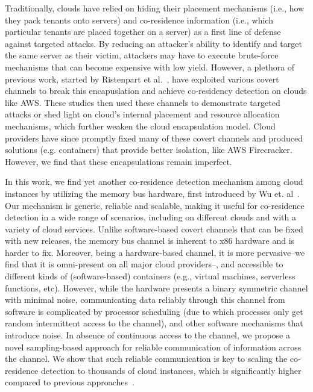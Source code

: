 Traditionally, clouds have relied on hiding their placement mechanisms (i.e.,
how they pack tenants onto servers) and co-residence information (i.e., which
particular tenants are placed together on a server) as a first line of defense
against targeted attacks. By reducing an attacker's ability to identify and
target the same server as their victim, attackers may have to execute
brute-force mechanisms that can become expensive with low yield. However, a plethora of
previous work, started by Ristenpart et al.~\cite{ristenpartccs2009}, have
exploited various covert channels to break this encapuslation and 
achieve co-residency detection on clouds
like AWS. These studies then used these channels to demonstrate targeted attacks
or shed light on cloud's internal placement and resource allocation
mechanisms, which further weaken the cloud encapsulation model. Cloud
providers have since promptly fixed many of these covert channels and produced
solutions (e.g. containers) that provide better isolation, like AWS
Firecracker\cite{firecracker}. However, we find that these encapsulations remain
imperfect.


In this work, we find yet another co-residence detection mechanism among cloud
instances by utilizing the memory bus hardware, first introduced by Wu et.
al~\cite{wuusenix2012}. Our mechanism is generic, reliable 
and scalable, making it useful for co-residence detection in a wide range of 
scenarios, including on different clouds and with a variety of cloud services.
Unlike software-based covert channels that can be fixed with new releases, 
the memory bus channel is inherent to x86 hardware and is harder to fix.  
Moreover, being a hardware-based channel, it is more pervasive--we find that it is
omni-present on all major cloud providers--, and accessible to different kinds of 
(software-based) containers (e.g., virtual machines, serverless functions, etc). 
However, while the hardware presents a binary symmetric channel with minimal 
noise, communicating data reliably through this channel from software is 
complicated by processor scheduling (due to which processes only get random 
intermittent access to the channel), and other software mechanisms that 
introduce noise. In absence of continuous access to the channel, we propose a 
novel sampling-based approach for reliable communication of information 
across the channel. We show that such reliable communication is key to 
scaling the co-residence detection to thousands of cloud instances, which 
is significantly higher compared to previous approaches~\cite{varadarajan2015}.

